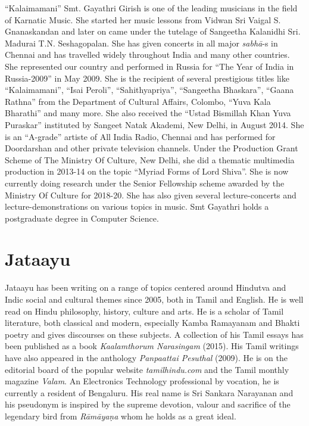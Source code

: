 “Kalaimamani” Smt. Gayathri Girish is one of the leading musicians in the field of Karnatic Music. She started her music lessons from Vidwan Sri Vaigal S. Gnanaskandan and later on came under the tutelage of Sangeetha Kalanidhi Sri. Madurai T.N. Seshagopalan. She has given concerts in all major \textit{sabhā}-s in Chennai and has travelled widely throughout India and many other countries. She represented our country and performed in Russia for “The Year of India in Russia-2009” in May 2009. She is the recipient of several prestigious titles like “Kalaimamani”, “Isai Peroli”, “Sahithyapriya”, “Sangeetha Bhaskara”, “Gaana Rathna” from the Department of Cultural Affairs, Colombo, “Yuva Kala Bharathi” and many more. She also received the “Ustad Bismillah Khan Yuva Puraskar” instituted by Sangeet Natak Akademi, New Delhi, in August 2014. She is an “A-grade” artiste of All India Radio, Chennai and has performed for Doordarshan and other private television channels. Under the Production Grant Scheme of The Ministry Of Culture, New Delhi, she did a thematic multimedia production in 2013-14 on the topic “Myriad Forms of Lord Shiva”. She is now currently doing research under the Senior Fellowship scheme awarded by the Ministry Of Culture for 2018-20. She has also given several lecture-concerts and lecture-demonstrations on various topics in music. Smt Gayathri holds a postgraduate degree in Computer Science.


\section*{Jataayu}

Jataayu has been writing on a range of topics centered around Hindutva and Indic social and cultural themes since 2005, both in Tamil and English. He is well read on Hindu philosophy, history, culture and arts. He is a scholar of Tamil literature, both classical and modern, especially Kamba Ramayanam and Bhakti poetry and gives discourses on these subjects. A collection of his Tamil essays has been published as a book \textit{Kaalamthorum Narasingam} (2015). His Tamil writings have also appeared in the anthology \textit{Panpaattai Pesuthal} (2009). He is on the editorial board of the popular website \textit{tamilhindu.com} and the Tamil monthly magazine \textit{Valam}. An Electronics Technology professional by vocation, he is currently a resident of Bengaluru. His real name is Sri Sankara Narayanan and his pseudonym is inspired by the supreme devotion, valour and sacrifice of the legendary bird from \textit{Rāmāyaṇa} whom he holds as a great ideal.


